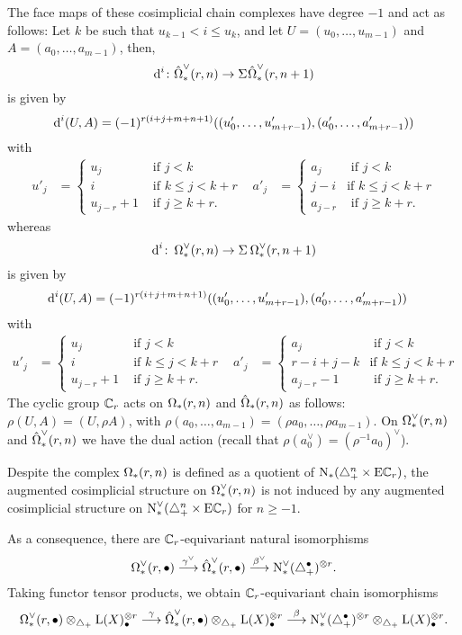 	The face maps of these cosimplicial chain complexes have degree $-1$ and act as follows: Let $k$ be such that $u_{k-1}<i\leq u_k$, and let $U = (u_0,\dots,u_{m-1})$ and $A = (a_0,\dots,a_{m-1})$, then,
	\[
		\operatorname{d}^i \colon \hat{\operatorname{\Omega}}^{\vee}_{*}(r,n) \to \Sigma^{}\hat{\operatorname{\Omega}}^{\vee}_{*}(r,n+1)
	\]
		is given by
	\[\operatorname{d}^i(U, A) = (-1)^{r(i+j+m+n+1)}((u'_0,\dots,u'_{m+r-1}),(a'_0,\dots,a'_{m+r-1}))\] with
\begin{align}\label{eq:Omegahat}
	u'_j &=
	\begin{cases}
		u_j &\text{ if $j<k$} \\
		i & \text{ if $k\leq j < k+r$} \\
		u_{j-r} + 1 & \text{ if $j \geq k+r$.}
	\end{cases}
	&
	a'_j &=
	\begin{cases}
		a_j &\text{ if $j<k$} \\
		j-i & \text{if $k\leq j<k+r$} \\
		a_{j-r} & \text{ if $j \geq k+r$.}
	\end{cases}
\end{align}
whereas
\[
	\operatorname{d}^i \colon \operatorname{\Omega}^{\vee}_{*}(r,n) \to \Sigma^{}\operatorname{\Omega}^{\vee}_{*}(r,n+1)
	\]
	is given by
\begin{align*}
	\operatorname{d}^i(U, A) &= (-1)^{r(i + j + m + n + 1)}((u'_0,\dots,u'_{m+r-1}),(a'_0,\dots,a'_{m+r-1}))
\end{align*}
with
\begin{align}\label{eq:Theta}
	u'_j &=
	\begin{cases}
		u_j &\text{ if $j<k$} \\
		i & \text{ if $k\leq j < k+r$} \\
		u_{j-r} + 1 & \text{ if $j \geq k+r$.}
	\end{cases}
	&
	a'_j &=
	\begin{cases}
		a_j &\text{ if $j<k$} \\
		r-i+j-k & \text{if $k\leq j<k+r$} \\
		a_{j-r}-1 & \text{ if $j \geq k+r$.}
	\end{cases}
\end{align}
The cyclic group $\mathbb{C}_r$ acts on $\operatorname{\Omega}_{*}(r,n)$ and $\hat{\operatorname{\Omega}}_{*}(r,n)$ as follows: $\rho(U,A) = (U,\rho A)$, with $\rho(a_0,\dots,a_{m-1}) = (\rho a_0,\dots,\rho a_{m-1})$. On $\operatorname{\Omega}^{\vee}_{*}(r,n)$ and $\hat{\operatorname{\Omega}}^{\vee}_{*}(r,n)$ we have the dual action (recall that $\rho(a_0^\vee) = (\rho^{-1}a_0)^\vee$).

\begin{remark}
	Despite the complex $\operatorname{\Omega}_{*}(r,n)$ is defined as a quotient of $\operatorname{N}_{*}(\triangle_{+}^n\times \mathrm{E}\mathbb{C}_r)$, the augmented cosimplicial structure on $\operatorname{\Omega}^{\vee}_{*}(r,n)$ is not induced by any augmented cosimplicial structure on $\operatorname{N}^\vee_{*}(\triangle_{+}^n\times \mathrm{E}\mathbb{C}_r)$ for $n \geq -1$.
\end{remark}
As a consequence, there are $\mathbb{C}_r$-equivariant natural isomorphisms
\[\operatorname{\Omega}^{\vee}_{*}(r,\bullet)\overset{\gamma^\vee}{\longrightarrow} \hat{\operatorname{\Omega}}^{\vee}_{*}(r,\bullet)\overset{\beta^\vee}{\longrightarrow} \operatorname{N}^\vee_{*}(\triangle_{+}^\bullet)^{\otimes r}.\]
Taking functor tensor products, we obtain $\mathbb{C}_r$-equivariant chain isomorphisms
\[\operatorname{\Omega}^{\vee}_{*}(r,\bullet) \otimes_{\triangle_{+}} \operatorname{L}(X)_\bullet^{\otimes r}\overset{\gamma}{\longrightarrow} \hat{\operatorname{\Omega}}^{\vee}_{*}(r,\bullet) \otimes_{\triangle_{+}} \operatorname{L}(X)_\bullet^{\otimes r}\overset{\beta}{\longrightarrow} \operatorname{N}^\vee_{*}(\triangle_{+}^\bullet)^{\otimes r} \otimes_{\triangle_{+}} \operatorname{L}(X)_\bullet^{\otimes r}.\]




